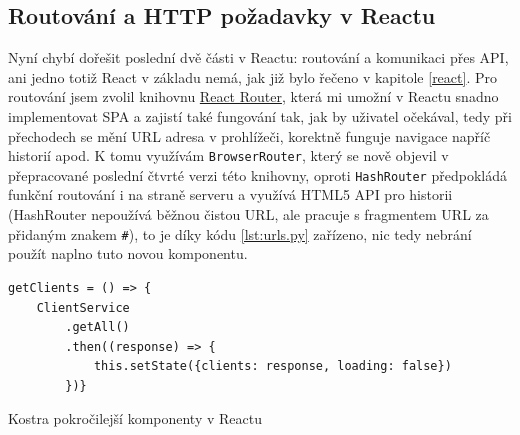     \subsection{Routování a HTTP požadavky v Reactu}
    Nyní chybí dořešit poslední dvě části v Reactu: routování a komunikaci přes API, ani jedno totiž React v základu nemá, jak již bylo řečeno v kapitole \ref{react}. Pro routování jsem zvolil knihovnu \href{https://reacttraining.com/}{React Router}, která mi umožní v Reactu snadno implementovat SPA a zajistí také fungování tak, jak by uživatel očekával, tedy při přechodech se mění URL adresa v prohlížeči, korektně funguje navigace napříč historií apod. K tomu využívám \verb|BrowserRouter|, který se nově objevil v přepracované poslední čtvrté verzi této knihovny, oproti \verb|HashRouter| předpokládá funkční routování i na straně serveru a využívá HTML5 API pro historii (HashRouter nepoužívá běžnou čistou URL, ale pracuje s fragmentem URL za přidaným znakem \verb|#|), to je díky kódu \ref{lst:urls.py} zařízeno, nic tedy nebrání použít naplno tuto novou komponentu.
    
    \begin{listing}[ht]
    	\begin{verbatim}
getClients = () => {
    ClientService
        .getAll()
        .then((response) => {
            this.setState({clients: response, loading: false})
        })}
    	\end{verbatim}
    	\caption{Kostra pokročilejší komponenty v Reactu}\label{lst:react3}
    \end{listing}
    
